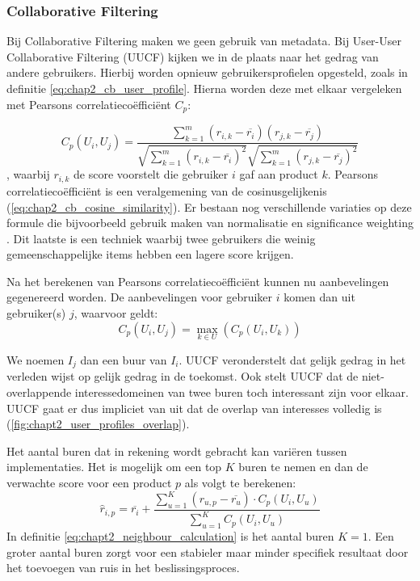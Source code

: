 \subsubsection{Collaborative Filtering}
\label{sec:chapt2_cf}
Bij Collaborative Filtering maken we geen gebruik van metadata. Bij User-User Collaborative Filtering (UUCF) kijken we in de plaats naar het gedrag van andere gebruikers. Hierbij worden opnieuw gebruikersprofielen opgesteld, zoals in definitie \ref{eq:chap2_cb_user_profile}. Hierna worden deze met elkaar vergeleken met Pearsons correlatiecoëfficiënt $C_p$:

\begin{equation}
    C_p(U_i, U_j) = \frac{\sum_{k = 1}^{m}(r_{i, k} - \overline{r_i})(r_{j, k} - \overline{r_j})}{\sqrt{\sum_{k = 1}^{m}(r_{i, k} - \overline{r_i})^2} \sqrt{\sum_{k = 1}^{m}(r_{j, k} - \overline{r_j})^2}}
    \label{eq:chapt2_pearson_corr}
\end{equation}
\cite{UUCF_original_paper}, waarbij $r_{i, k}$ de score voorstelt die gebruiker $i$ gaf aan product $k$.
Pearsons correlatiecoëfficiënt is een veralgemening van de cosinusgelijkenis (\ref{eq:chap2_cb_cosine_similarity}). Er bestaan nog verschillende variaties \cite{UUCF_alternative_implementations} op deze formule die bijvoorbeeld gebruik maken van normalisatie en significance weighting \cite{CF_significance_weighting}. Dit laatste is een techniek waarbij twee gebruikers die weinig gemeenschappelijke items hebben een lagere score krijgen.

Na het berekenen van Pearsons correlatiecoëfficiënt kunnen nu aanbevelingen gegenereerd worden. De aanbevelingen voor gebruiker $i$ komen dan uit gebruiker(s) $j$, waarvoor geldt:
\begin{equation}
    C_p(U_i, U_j) = \max_{k \in U}(C_p(U_i, U_k))    
    \label{eq:chapt2_neighbour_calculation}
\end{equation}

We noemen $I_j$ dan een buur van $I_i$. UUCF veronderstelt dat gelijk gedrag in het verleden wijst op gelijk gedrag in de toekomst. Ook stelt UUCF dat de niet-overlappende interessedomeinen van twee buren toch interessant zijn voor elkaar. UUCF gaat er dus impliciet van uit dat de overlap van interesses volledig is (\autoref{fig:chapt2_user_profiles_overlap}).


Het aantal buren dat in rekening wordt gebracht kan variëren tussen implementaties. Het is mogelijk om een top $K$ buren te nemen en dan de verwachte score voor een product $p$ als volgt te berekenen:
\begin{equation}
    \hat{r}_{i, p} = \overline{r_i} + \frac{\sum_{u=1}^{K}(r_{u, p} - \overline{r_u}) \cdot C_p(U_i, U_u)}{\sum_{u=1}^{K} C_p(U_i, U_u)}
    \label{eq:chapt2_uucf_finding_predictions_from_neighbours}
\end{equation}
In definitie \ref{eq:chapt2_neighbour_calculation} is het aantal buren $K = 1$. Een groter aantal buren zorgt voor een stabieler maar minder specifiek resultaat door het toevoegen van ruis in het beslissingsproces. \cite{cursus_hs8}

